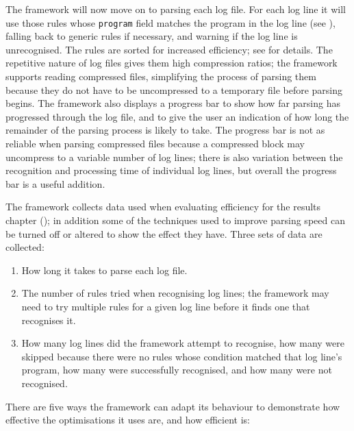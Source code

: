 The framework will now move on to parsing each log file.  For each log line
it will use those rules whose \texttt{program} field matches the program in
the log line (see ), falling
back to generic rules if necessary, and warning if the log line is
unrecognised.  The rules are sorted for increased efficiency; see
 for details.  The repetitive
nature of log files gives them high compression ratios; the framework
supports reading compressed files, simplifying the process of parsing them
because they do not have to be uncompressed to a temporary file before
parsing begins.  The framework also displays a progress bar to show how far
parsing has progressed through the log file, and to give the user an
indication of how long the remainder of the parsing process is likely to
take.  The progress bar is not as reliable when parsing compressed files
because a compressed block may uncompress to a variable number of log
lines; there is also variation between the recognition and processing time
of individual log lines, but overall the progress bar is a useful addition.

The framework collects data used when evaluating \parsernames{} efficiency
for the results chapter (); in addition some of the
techniques used to improve parsing speed can be turned off or altered to
show the effect they have.  Three sets of data are collected:

\begin{enumerate}

    \item How long it takes to parse each log file.

    \item The number of rules tried when recognising log lines; the
        framework may need to try multiple rules for a given log line
        before it finds one that recognises it.

    \item How many log lines did the framework attempt to recognise, how
        many were skipped because there were no rules whose condition
        matched that log line's program, how many were successfully
        recognised, and how many were not recognised.

\end{enumerate}

There are five ways the framework can adapt its behaviour to demonstrate
how effective the optimisations it uses are, and how efficient
\parsername{} is:

